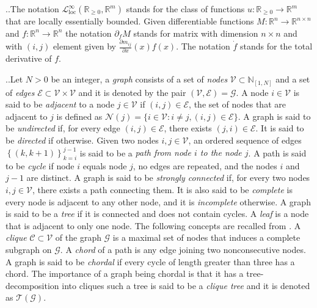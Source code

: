 \documentclass[10pt,twocolumn,twoside]{IEEEtran}
\newcounter{para}
\newcommand\mypara{\par \thesection.\refstepcounter{para}\thepara.\space}
\theoremstyle{plain}
\theoremstyle{definition}
\theoremstyle{remark}
\begin{document}
\mypara The notation $\mathcal{L}_{\mathrm{loc}}^\infty(\mathbb{R}_{\geq0},\mathbb{R}^m)$ stands for the class of functions $u:\mathbb{R}_{\geq0}\to\mathbb{R}^m$ that are locally essentially bounded. Given differentiable functions $M:\mathbb{R}^n\to\mathbb{R}^{n\times n}$ and $f:\mathbb{R}^n\to\mathbb{R}^n$ the notation $\partial_fM$ stands for matrix with dimension $n\times n$ and with $(i,j)$ element given by $\frac{\partial m_{ij}}{\partial x}(x)f(x)$. The notation $\dot{f}$ stands for the total derivative of $f$.

\mypara Let $N>0$ be an integer, a \emph{graph} consists of a set of \emph{nodes} $\mathscr{V}\subset\mathbb{N}_{[1,N]}$ and a set of \emph{edges} $\mathscr{E}\subset\mathscr{V}\times\mathscr{V}$ and it is denoted by the pair $(\mathscr{V},\mathscr{E})=\mathscr{G}$. A node $i\in\mathscr{V}$ is said to be \emph{adjacent} to a node $j\in\mathscr{V}$ if $(i,j)\in\mathscr{E}$, the set of nodes that are adjacent to $j$ is defined as $\mathscr{N}(j)=\{i\in\mathscr{V}:i\neq j,(i,j)\in\mathscr{E}\}$. A graph is said to be \emph{undirected} if, for every edge $(i,j)\in\mathscr{E}$, there exists $(j,i)\in\mathscr{E}$. It is said to be \emph{directed} if otherwise. Given two nodes $i,j\in\mathscr{V}$, an ordered sequence of edges $\left\{(k,k+1)\right\}_{k=i}^{j-1}$ is said to be a \emph{path from node $i$ to the node $j$}. A path is said to be \emph{cycle} if node $i$ equals node $j$, no edges are repeated, and the nodes $i$ and $j-1$  are distinct. A graph is said to be \emph{strongly connected} if, for every two nodes $i,j\in\mathscr{V}$, there exists a path connecting them. It is also said to be \emph{complete} is every node is adjacent to any other node, and it is \emph{incomplete} otherwise. A graph is said to be a \emph{tree} if it is connected and does not contain cycles. A \emph{leaf} is a node that is adjacent to only one node. The following concepts are recalled from \cite{PakazadHanssonAndersenEtAl2015,VandenbergheAndersen2015,BlairPeyton1993}. A \emph{clique} $\mathscr{C}\subset\mathscr{V}$ of the graph $\mathscr{G}$ is a maximal set of nodes that induces a complete subgraph on $\mathscr{G}$. A \emph{chord} of a path is any edge joining two nonconsecutive nodes. A graph is said to be \emph{chordal} if every cycle of length greater than three has a chord. The importance of a graph being chordal is that it has a tree-decomposition into cliques  \cite[Proposition~12.3.11]{Diestel2005} such a tree is said to be a \emph{clique tree} and it is denoted as $\mathscr{T}(\mathscr{G})$.
\end{document}
